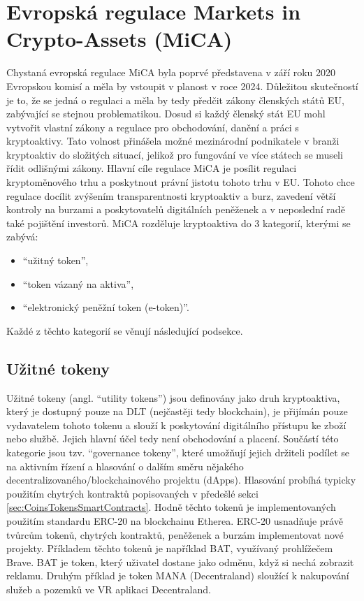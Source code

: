 \section*{Evropská regulace Markets in Crypto-Assets (MiCA)}
Chystaná evropská regulace MiCA \cite{mica} byla poprvé představena v září roku 2020 Evropskou komisí a měla by vstoupit v planost v roce 2024. Důležitou skutečností je to, že se jedná o regulaci
a měla by tedy předčit zákony členských států EU, zabývající se stejnou problematikou. Dosud si každý členský stát EU mohl vytvořit vlastní zákony a regulace pro obchodování, danění
a práci s kryptoaktivy. Tato volnost přinášela možné mezinárodní podnikatele v branži kryptoaktiv do složitých situací, jelikož pro fungování ve více státech se museli řídit odlišnými
zákony. Hlavní cíle regulace MiCA je posílit regulaci kryptoměnového trhu a poskytnout právní jistotu tohoto trhu v EU. Tohoto chce regulace docílit zvýšením transparentnosti kryptoaktiv a burz,
zavedení větší kontroly na burzami a poskytovatelů digitálních peněženek a v neposlední radě také pojištění investorů.
MiCA rozděluje kryptoaktiva do 3 kategorií, kterými se zabývá:
\begin{itemize}
    \item \enquote{užitný token},
    \item \enquote{token vázaný na aktiva},
    \item \enquote{elektronický peněžní token (e-token)}.
\end{itemize}
Každé z těchto kategorií se věnují následující podsekce.

\subsection{Užitné tokeny}
Užitné tokeny (angl. \enquote{utility tokens}) jsou definovány jako druh kryptoaktiva, který je dostupný pouze na DLT (nejčastěji tedy blockchain), je přijímán pouze vydavatelem tohoto
tokenu a slouží k poskytování digitálního přístupu ke zboží nebo službě. Jejich hlavní účel tedy není obchodování a placení. Součástí této kategorie jsou tzv. \enquote{governance tokeny},
které umožňují jejich držiteli podílet se na aktivním řízení a hlasování o dalším směru nějakého decentralizovaného/blockchainového projektu (dApps). Hlasování probíhá typicky
použitím chytrých kontraktů popisovaných v předešlé sekci \ref{sec:CoinsTokensSmartContracts}. Hodně těchto tokenů je implementovaných použitím standardu ERC-20 na blockchainu Etherea.
ERC-20 usnadňuje právě tvůrcům tokenů, chytrých kontraktů, peněženek a burzám implementovat nové projekty. Příkladem těchto tokenů je například BAT, využívaný prohlížečem Brave.
BAT je token, který uživatel dostane jako odměnu, když si nechá zobrazit reklamu. Druhým příklad je token MANA (Decentraland) sloužící k nakupování služeb a pozemků ve VR aplikaci
Decentraland.

